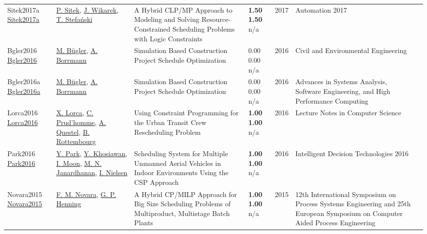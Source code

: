{\begin{longtable}{p{3cm}p{5cm}p{10cm}p{1cm}rp{2.5cm}l}
Sitek2017a \href{http://dx.doi.org/10.1007/978-3-319-54042-9_12}{Sitek2017a} & \hyperref[auth:a1475]{P. Sitek}, \hyperref[auth:a1476]{J. Wikarek}, \hyperref[auth:a1609]{T. Stefański} & A Hybrid CLP/MP Approach to Modeling and Solving Resource-Constrained Scheduling Problems with Logic Constraints & \noindent{}\textbf{1.50} \textbf{1.50} n/a & 2017 & Automation 2017 & \cite{Sitek2017a}\\
Bgler2016 \href{http://dx.doi.org/10.4018/978-1-4666-9619-8.ch006}{Bgler2016} & \hyperref[auth:a1544]{M. Bügler}, \hyperref[auth:a1545]{A. Borrmann} & \cellcolor{gold!20}Simulation Based Construction Project Schedule Optimization & \noindent{}\textcolor{black!50}{0.00} \textcolor{black!50}{0.00} n/a & 2016 & Civil and Environmental Engineering & \cite{Bgler2016}\\
Bgler2016a \href{http://dx.doi.org/10.4018/978-1-4666-8823-0.ch016}{Bgler2016a} & \hyperref[auth:a1544]{M. Bügler}, \hyperref[auth:a1545]{A. Borrmann} & Simulation Based Construction Project Schedule Optimization & \noindent{}\textcolor{black!50}{0.00} \textcolor{black!50}{0.00} n/a & 2016 & Advances in Systems Analysis, Software Engineering, and High Performance Computing & \cite{Bgler2016a}\\
Lorca2016 \href{http://dx.doi.org/10.1007/978-3-319-44953-1_40}{Lorca2016} & \hyperref[auth:a244]{X. Lorca}, \hyperref[auth:a1859]{C. Prud’homme}, \hyperref[auth:a1860]{A. Questel}, \hyperref[auth:a1576]{B. Rottembourg} & \cellcolor{green!10}Using Constraint Programming for the Urban Transit Crew Rescheduling Problem & \noindent{}\textbf{1.00} \textbf{1.00} n/a & 2016 & Lecture Notes in Computer Science & \cite{Lorca2016}\\
Park2016 \href{http://dx.doi.org/10.1007/978-3-319-39630-9_7}{Park2016} & \hyperref[auth:a1701]{Y. Park}, \hyperref[auth:a1702]{Y. Khosiawan}, \hyperref[auth:a1703]{I. Moon}, \hyperref[auth:a1704]{M. N. Janardhanan}, \hyperref[auth:a1705]{I. Nielsen} & Scheduling System for Multiple Unmanned Aerial Vehicles in Indoor Environments Using the CSP Approach & \noindent{}\textbf{1.00} \textbf{1.00} n/a & 2016 & Intelligent Decision Technologies 2016 & \cite{Park2016}\\
Novara2015 \href{http://dx.doi.org/10.1016/b978-0-444-63576-1.50032-7}{Novara2015} & \hyperref[auth:a587]{F. M. Novara}, \hyperref[auth:a588]{G. P. Henning} & A Hybrid CP/MILP Approach for Big Size Scheduling Problems of Multiproduct, Multistage Batch Plants & \noindent{}\textbf{1.00} \textbf{1.00} n/a & 2015 & 12th International Symposium on Process Systems Engineering and 25th European Symposium on Computer Aided Process Engineering & \cite{Novara2015}\\

\end{longtable}}
